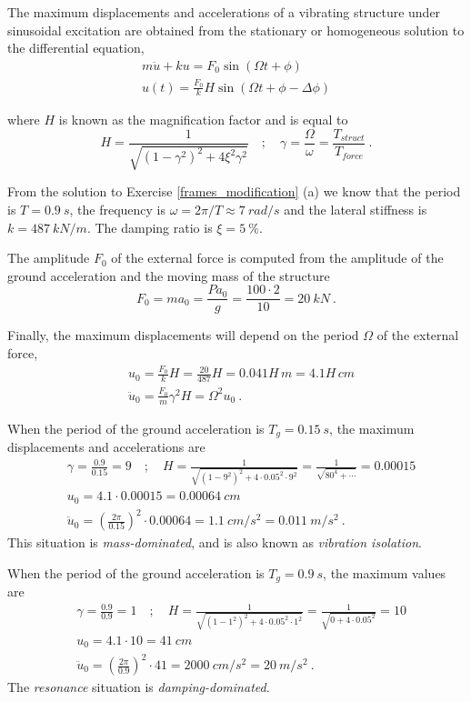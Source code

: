 \begin{Answer}[ref={frame_ground_acceleration}]
The maximum displacements and accelerations of a vibrating structure under sinusoidal excitation are obtained from the stationary or homogeneous solution to the differential equation,
\begin{align*}
m\ddot{u} + ku = F_0\sin(\Omega t + \phi) \\
u(t) = \frac{F_0}{k}H\sin(\Omega t + \phi - \Delta\phi)
\end{align*}

where $H$ is known as the magnification factor and is equal to
$$
H = \frac{1}{\sqrt{(1-\gamma^2)^2 + 4\xi^2\gamma^2}} \quad ; \quad
\gamma = \frac{\Omega}{\omega} = \frac{T_{struct}}{T_{force}}\ .
$$

From the solution to Exercise \ref{frames_modification} (a) we know that the period is $T=\SI{0.9}{s}$, the frequency is $\omega = 2\pi/T \approx \SI{7}{rad/s}$ and the lateral stiffness is $k=\SI{487}{kN/m}$. The damping ratio is $\xi=\SI{5}{\%}$.

The amplitude $F_0$ of the external force is computed from the amplitude of the ground acceleration and the moving mass of the structure
$$
F_0 = ma_{0} = \frac{Pa_0}{g} = \frac{100\cdot2}{10} = \SI{20}{kN}\ .
$$

Finally, the maximum displacements will depend on the period $\Omega$ of the external force,
\begin{align*}
&u_0 = \frac{F_0}{k}H = \frac{20}{487}H = 0.041H\,\si{m} = 4.1H\,\si{cm} \\
&\ddot{u}_0 = \frac{F_0}{m}\gamma^2H = \Omega^2u_0\ .
\end{align*}


When the period of the ground acceleration is $T_g=\SI{0.15}{s}$, the maximum displacements and accelerations are
\begin{align*}
&\gamma = \frac{0.9}{0.15} = 9 \quad ; \quad
H = \frac{1}{\sqrt{(1-9^2)^2 + 4\cdot 0.05^2\cdot 9^2}} = \frac{1}{\sqrt{80^4 + \cdots}} = 0.00015 \\
&u_0 = 4.1\cdot 0.00015 = \SI{0.00064}{cm} \\
&\ddot{u}_0 = \left(\frac{2\pi}{0.15}\right)^2 \cdot 0.00064 = \SI{1.1}{cm/s^2} = \SI{0.011}{m/s^2}\ .
\end{align*}
This situation is \emph{mass-dominated}, and is also known as \emph{vibration isolation}.

When the period of the ground acceleration is $T_g=\SI{0.9}{s}$, the maximum values are
\begin{align*}
&\gamma = \frac{0.9}{0.9} = 1 \quad ; \quad
H = \frac{1}{\sqrt{(1-1^2)^2 + 4\cdot 0.05^2\cdot 1^2}} = \frac{1}{\sqrt{0 + 4\cdot 0.05^2}} = 10 \\
&u_0 = 4.1\cdot 10 = \SI{41}{cm} \\
&\ddot{u}_0 = \left(\frac{2\pi}{0.9}\right)^2 \cdot 41 = \SI{2000}{cm/s^2} = \SI{20}{m/s^2}\ .
\end{align*}
The \emph{resonance} situation is \emph{damping-dominated}.


\end{Answer}

